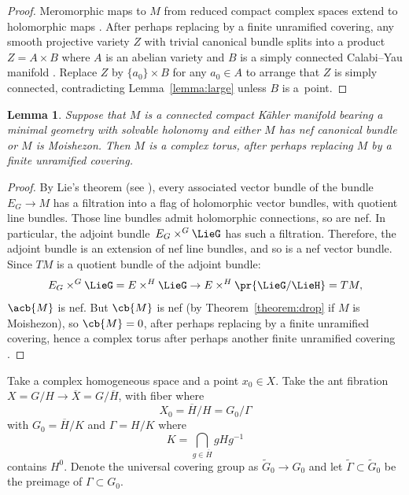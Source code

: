 \documentclass[pdftex]{sigma}
\numberwithin{equation}{section}
\newtheorem{Lemma}[Theorem]{Lemma}
\newcommand{\GZ}{G_0}
\newcommand{\tGZ}{\widetilde{G}_0}
\begin{document}
\begin{proof}
Meromorphic maps to $M$ from reduced compact complex spaces extend to holomorphic maps \cite[Lemma 26]{Biswas.McKay:2016}.
After perhaps replacing by a finite unramified covering, any smooth projective variety $Z$ with trivial canonical bundle splits into a product $Z=A \times B$ where $A$ is an abelian variety and $B$ is a simply connected Calabi--Yau manifold \cite{Bogomolov:1974}.
Replace $Z$ by $\{a_0\} \times B$ for any $a_0 \in A$ to arrange that $Z$ is simply connected, contradicting
Lemma~\ref{lemma:large} unless $B$ is a~point.
\end{proof}

\begin{Lemma}\label{lemma:solvable.nef}
Suppose that $M$ is a connected compact K\"ahler manifold bearing a minimal geometry with solvable holonomy and either $M$ has nef canonical bundle or $M$ is Moishezon.
Then $M$ is a complex torus, after perhaps replacing $M$ by a finite unramified covering.
\end{Lemma}

\begin{proof}
By Lie's theorem (see \cite[Theorem 3]{Serre:2001}), every associated vector bundle of the bundle $E_G \to M$ has a filtration into a flag of holomorphic vector bundles, with quotient line bundles.
Those line bundles admit holomorphic connections, so are nef.
In particular, the adjoint bundle~$E_G \times^G \LieG$ has such a filtration.
Therefore, the adjoint bundle is an extension of nef line bundles, and so is a nef vector bundle.
Since $TM$ is a quotient bundle of the adjoint bundle:
\[
E_G \times^G \LieG = E \times^H \LieG \to E \times^H \pr{\LieG/\LieH} = TM,
\]
$\acb{M}$ is nef.
But $\cb{M}$ is nef (by Theorem~\ref{theorem:drop} if $M$ is Moishezon), so $\cb{M} = 0$, after perhaps replacing by a finite unramified covering, hence a complex torus after perhaps another finite unramified covering \cite{Biswas.McKay:2010}.
\end{proof}

Take a complex homogeneous space  and a point $x_0 \in X$.
Take the ant fibration $X = G/H \to \overline{X} = G/\overline{H}$, with fiber \pr{X_0,\GZ} where
\[
X_0 = \overline{H}/H = \GZ/\Gamma
\]
with $\GZ = \overline{H}/K$ and $\Gamma = H/K$ where
\[
K = \bigcap_{g\in\overline{H}} gHg^{-1}
\]
contains $H^0$.
Denote the universal covering group as $\tGZ \to \GZ$ and let $\widetilde{\Gamma} \subset \tGZ$ be the
preimage of $\Gamma \subset \GZ$.
\end{document}

